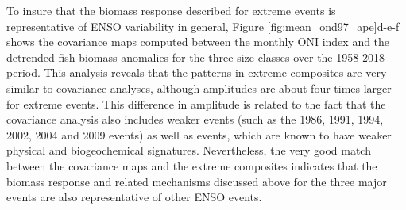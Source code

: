 To insure that the biomass response described for extreme \nino{} events is representative of ENSO variability in general, Figure \ref{fig:mean_ond97_ape}d-e-f shows the covariance maps computed between the monthly ONI index and the detrended fish biomass anomalies for the three size classes over the 1958-2018 period. This analysis reveals that the patterns in extreme \nino{} composites are very similar to covariance analyses, although amplitudes are about four times larger for extreme events. This  difference  in amplitude is related to the fact that the covariance analysis also includes weaker \nino{} events (such as the 1986, 1991, 1994, 2002, 2004 and 2009 events) as well as \nina{} events, which are known to have weaker physical and biogeochemical signatures. Nevertheless, the very good match between the covariance maps and the extreme \nino{} composites indicates that the biomass response and related mechanisms discussed above for the three major \nino{} events are also representative of other ENSO events.
